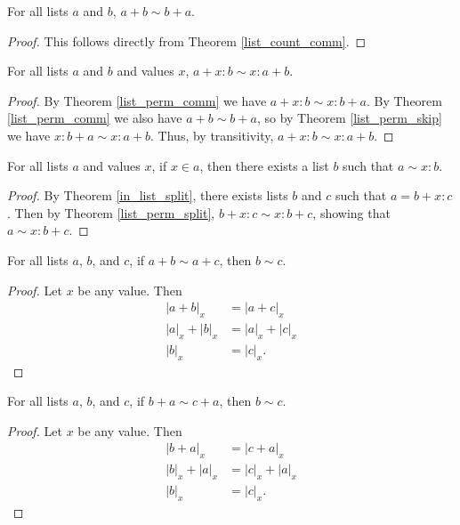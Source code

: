 \documentclass[../../math.tex]{subfiles}
\begin{document}
\begin{theorem} \label{list_perm_comm}
    For all lists $a$ and $b$, $a + b \sim b + a$.
\end{theorem}
\begin{proof}
    This follows directly from Theorem \ref{list_count_comm}.
\end{proof}

\begin{theorem} \label{list_perm_split}
    For all lists $a$ and $b$ and values $x$, $a + x : b \sim x : a + b$.
\end{theorem}
\begin{proof}
    By Theorem \ref{list_perm_comm} we have $a + x : b \sim x : b + a$.  By
    Theorem \ref{list_perm_comm} we also have $a + b \sim b + a$, so by Theorem
    \ref{list_perm_skip} we have $x : b + a \sim x : a + b$.  Thus, by
    transitivity, $a + x : b \sim x : a + b$.
\end{proof}

\begin{theorem} \label{list_split_perm}
    For all lists $a$ and values $x$, if $x \in a$, then there exists a list $b$
    such that $a \sim x : b$.
\end{theorem}
\begin{proof}
    By Theorem \ref{in_list_split}, there exists lists $b$ and $c$ such that $a
    = b + x : c$.  Then by Theorem \ref{list_perm_split}, $b + x : c \sim x : b
    + c$, showing that $a \sim x : b + c$.
\end{proof}

\begin{theorem} \label{list_perm_conc_lcancel}
    For all lists $a$, $b$, and $c$, if $a + b \sim a + c$, then $b \sim c$.
\end{theorem}
\begin{proof}
    Let $x$ be any value.  Then
    \begin{align*}
        |a + b|_x &= |a + c|_x \\
        |a|_x + |b|_x &= |a|_x + |c|_x \\
        |b|_x &= |c|_x.
    \end{align*}
\end{proof}

\begin{theorem} \label{list_perm_conc_rcancel}
    For all lists $a$, $b$, and $c$, if $b + a \sim c + a$, then $b \sim c$.
\end{theorem}
\begin{proof}
    Let $x$ be any value.  Then
    \begin{align*}
        |b + a|_x &= |c + a|_x \\
        |b|_x + |a|_x &= |c|_x + |a|_x \\
        |b|_x &= |c|_x.
    \end{align*}
\end{proof}
\end{document}
